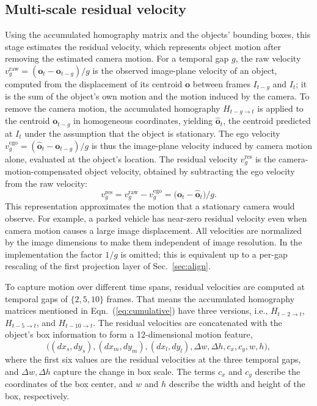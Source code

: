 \documentclass{article}
\begin{document}
\subsection{Multi-scale residual velocity}
\label{sec:residual}
Using the accumulated homography matrix and the objects' bounding boxes, this stage estimates the residual velocity, which represents object motion after removing the estimated camera motion. For a temporal gap $g$, the raw velocity $v^{\mathrm{raw}}_{g} = (\boldsymbol{o}_{t}-\boldsymbol{o}_{t-g})/g$ is the observed image-plane velocity of an object, computed from the displacement of its centroid $\boldsymbol{o}$ between frames $I_{t-g}$ and $I_{t}$; it is the sum of the object's own motion and the motion induced by the camera. To remove the camera motion, the accumulated homography $H_{t-g \to t}$ is applied to the centroid $\boldsymbol{o}_{t-g}$ in homogeneous coordinates, yielding $\hat{\boldsymbol{o}}_{t}$, the centroid predicted at $I_{t}$ under the assumption that the object is stationary. The ego velocity $v^{\mathrm{ego}}_{g} = (\hat{\boldsymbol{o}}_{t}-\boldsymbol{o}_{t-g})/g$ is thus the image-plane velocity induced by camera motion alone, evaluated at the object's location. The residual velocity $v^{\mathrm{res}}_{g}$ is the camera-motion-compensated object velocity, obtained by subtracting the ego velocity from the raw velocity:
\begin{equation}
  v^{\mathrm{res}}_{g} = v^{\mathrm{raw}}_{g} - v^{\mathrm{ego}}_{g} = \bigl(\boldsymbol{o}_{t}-\hat{\boldsymbol{o}}_{t}\bigr)/g.
  \label{eq:residual}
\end{equation}
This representation approximates the motion that a stationary camera would observe. For example, a parked vehicle has near-zero residual velocity even when camera motion causes a large image displacement. All velocities are normalized by the image dimensions to make them independent of image resolution. In the implementation the factor $1/g$ is omitted; this is equivalent up to a per-gap rescaling of the first projection layer of Sec.~\ref{sec:align}.

To capture motion over different time spans, residual velocities are computed at temporal gaps of $\{2,5,10\}$ frames. That means the accumulated homography matrices mentioned in Eqn.~(\ref{eq:cumulative}) have three versions, i.e., $H_{t-2 \to t}$, $H_{t-5 \to t}$, and $H_{t-10 \to t}$. The residual velocities are concatenated with the object's box information to form a 12-dimensional motion feature,
\begin{equation}
  \bigl((dx_s,dy_s),(dx_m,dy_m),(dx_l,dy_l),\Delta w,\Delta h,c_x,c_y,w,h\bigr),
  \label{eq:descriptor}
\end{equation}
where the first six values are the residual velocities at the three temporal gaps, and $\Delta w, \Delta h$ capture the change in box scale. The terms $c_x$ and $c_y$ describe the coordinates of the box center, and $w$ and $h$ describe the width and height of the box, respectively.
\end{document}
